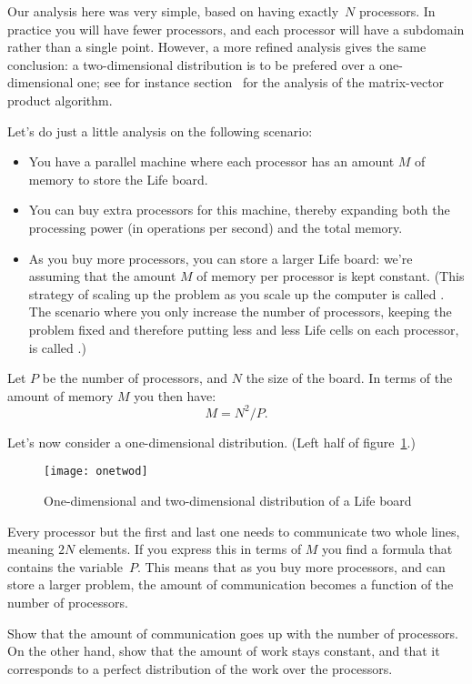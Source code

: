 Our analysis here was very simple, based on having exactly~$N$ processors.
In practice you will have fewer processors, and each processor will
have a subdomain rather than a single point.
However, a more refined analysis gives the same conclusion:
a two-dimensional distribution is to be prefered over a one-dimensional one;
see for instance section~ for the analysis
of the matrix-vector product algorithm.

Let's do just a little analysis on the following scenario:
\begin{itemize}
\item You have a parallel machine where each processor has an amount
  $M$ of memory to store the Life board.
\item You can buy extra processors for this machine, thereby expanding
  both the processing power (in operations per second) and the total
  memory.
\item As you buy more processors, you can store a larger Life board:
  we're assuming that the amount $M$ of memory per processor is kept constant. (This
  strategy of scaling up the problem as you scale up the computer is
  called . The scenario where you only
  increase the number of processors, keeping the problem fixed and
  therefore putting less and less Life cells on each processor,
  is called .)
\end{itemize}

Let $P$ be the number of processors, and $N$ the size of the
board. In terms of the amount of memory $M$ you then have:
\[ M=N^2/P. \]

Let's now consider a one-dimensional distribution. (Left half of figure~\ref{fig:onetwod}.)
\begin{figure}[t]
  \texttt{[image: onetwod]}
  \caption{One-dimensional and two-dimensional distribution of a Life board}
  \label{fig:onetwod}
\end{figure}
Every processor but
the first and last one needs to communicate two whole lines, meaning
$2N$ elements. If you express this in terms of $M$ you find a formula
that contains the variable~$P$. This means that as you buy more
processors, and can store a larger problem, the amount of
communication becomes a function of the number of processors.

\begin{exercise}
  Show that the amount of communication goes up with the number of
  processors. On the other hand, show that the amount of work stays
  constant, and that it corresponds to a perfect distribution of the
  work over the processors.
\end{exercise}

